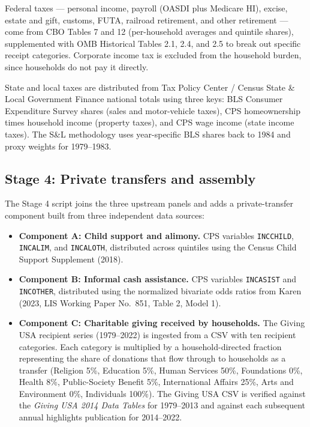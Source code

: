 \documentclass[11pt,letterpaper]{article}
\begin{document}
Federal taxes --- personal income, payroll (OASDI plus Medicare HI), excise,
estate and gift, customs, FUTA, railroad retirement, and other retirement ---
come from CBO Tables 7 and 12 (per-household averages and quintile shares),
supplemented with OMB Historical Tables 2.1, 2.4, and 2.5 to break out
specific receipt categories. Corporate income tax is excluded from the
household burden, since households do not pay it directly.

State and local taxes are distributed from Tax Policy Center / Census State
\& Local Government Finance national totals using three keys: BLS Consumer
Expenditure Survey shares (sales and motor-vehicle taxes), CPS homeownership
times household income (property taxes), and CPS wage income (state income
taxes). The S\&L methodology uses year-specific BLS shares back to 1984 and
proxy weights for 1979--1983.

\subsection{Stage 4: Private transfers and assembly}

The Stage 4 script joins the three upstream panels and adds a private-transfer
component built from three independent data sources:

\begin{itemize}[leftmargin=*]
  \item \textbf{Component A: Child support and alimony.} CPS variables
        \texttt{INCCHILD}, \texttt{INCALIM}, and \texttt{INCALOTH}, distributed
        across quintiles using the Census Child Support Supplement (2018).
  \item \textbf{Component B: Informal cash assistance.} CPS variables
        \texttt{INCASIST} and \texttt{INCOTHER}, distributed using the
        normalized bivariate odds ratios from Karen (2023, LIS Working Paper
        No.~851, Table 2, Model 1).
  \item \textbf{Component C: Charitable giving received by households.} The
        Giving USA recipient series (1979--2022) is ingested from a CSV with
        ten recipient categories. Each category is multiplied by a
        household-directed fraction representing the share of donations that
        flow through to households as a transfer (Religion 5\%, Education
        5\%, Human Services 50\%, Foundations 0\%, Health 8\%,
        Public-Society Benefit 5\%, International Affairs 25\%, Arts and
        Environment 0\%, Individuals 100\%). The Giving USA CSV is verified
        against the \emph{Giving USA 2014 Data Tables} for 1979--2013 and
        against each subsequent annual highlights publication for 2014--2022.
\end{itemize}
\end{document}
